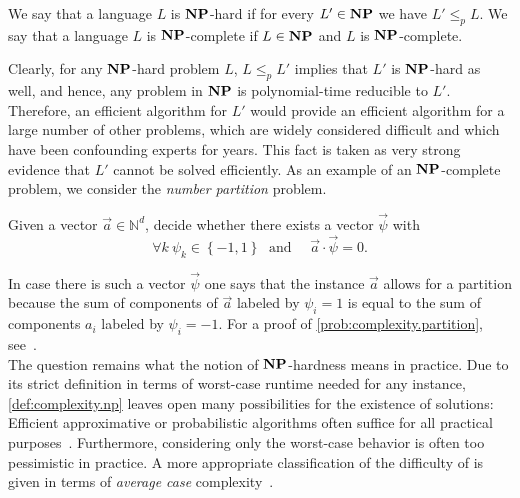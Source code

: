 \begin{definition}
  \label{def:complexity.hard_and_complete}
  We say that a language $L$ is $\mathbf{NP}$-hard if for every $L' \in \mathbf{NP}$ we have $L' \le_p L$.
  We say that a language $L$ is $\mathbf{NP}$-complete if $L \in \mathbf{NP}$ and $L$ is $\mathbf{NP}$-complete.
\end{definition}

Clearly, for any $\mathbf{NP}$-hard problem $L$, $L \le_p L'$ implies that $L'$ is $\mathbf{NP}$-hard as well, and hence, any problem in $\mathbf{NP}$ is polynomial-time reducible to $L'$.
Therefore, an efficient algorithm for $L'$ would provide an efficient algorithm for a large number of other problems, which are widely considered difficult and which have been confounding experts for years.
This fact is taken as very strong evidence that $L'$ cannot be solved efficiently.
As an example of an $\mathbf{NP}$-complete problem, we consider the \emph{number partition} problem.
\begin{problem}\label{prob:complexity.partition}
  Given a vector $\vec a \in \mathbb{N}^d$, decide whether there exists a vector $\vec \psi$ with
  \[
    \forall{k}\:\psi_{k}\in\left\{ -1,1\right\} \;\textrm{ and }\quad \vec a \cdot \vec\psi=0.
    \label{eq:ellpos.partition_vector}
  \]
\end{problem}
In case there is such a vector $\vec \psi$ one says that the instance $\vec a$ allows for a partition because the sum of components of $\vec a$ labeled by $\psi_i = 1$ is equal to the sum of components $a_i$ labeled by $\psi_i = -1$.
For a proof of \cref{prob:complexity.partition}, see~\cite{Garey_2002_Computers}.\\



The question remains what the notion of $\mathbf{NP}$-hardness means in practice.
Due to its strict definition in terms of worst-case runtime needed for any instance, \cref{def:complexity.np} leaves open many possibilities for the existence of  solutions:
Efficient approximative or probabilistic algorithms often suffice for all practical purposes~\cite{Garey_2002_Computers,Arora_2009_Computational}.
Furthermore, considering only the worst-case behavior is often too pessimistic in practice.
A more appropriate classification of the difficulty of  is given in terms of \emph{average case} complexity~\cite{Arora_2009_Computational}.

